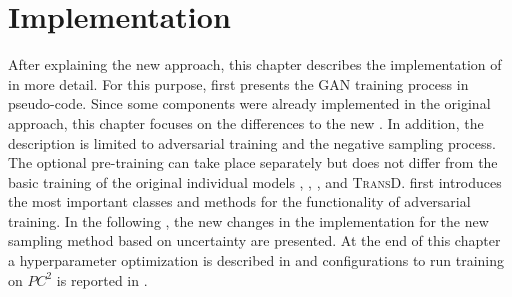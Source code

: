 \chapter{Implementation}
\label{ch:implementation}
%
After explaining the new approach, this chapter describes the implementation of \usgan in more detail.
For this purpose,  first presents the \ac{GAN} training process in pseudo-code.
Since some components were already implemented in the original \kbgan approach, this chapter focuses on the differences to the new \usgan.
In addition, the description is limited to adversarial training and the negative sampling process.
The optional pre-training can take place separately but does not differ from the basic training of the original individual models \distmult, \complex, \transe, and \textsc{TransD}.
 first introduces the most important classes and methods for the functionality of adversarial training.
In the following , the new changes in the implementation for the new sampling method based on uncertainty are presented.
At the end of this chapter a hyperparameter optimization is described in  and configurations to run training on $PC^2$ is reported in .








\clearpage

